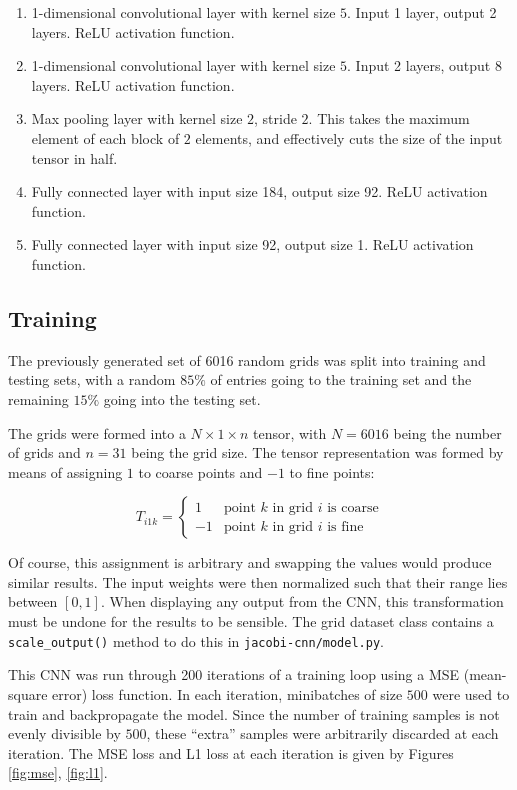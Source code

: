 \begin{enumerate}
\item 1-dimensional convolutional layer with kernel size $5$.  Input 1 layer, output 2 layers.  ReLU activation function.
\item 1-dimensional convolutional layer with kernel size $5$.  Input 2 layers, output 8 layers.  ReLU activation function.
\item Max pooling layer with kernel size $2$, stride $2$.  This takes the maximum element of each block of $2$ elements, and effectively cuts the size of the input tensor in half.
\item Fully connected layer with input size 184, output size 92.  ReLU activation function.
\item Fully connected layer with input size 92, output size 1.  ReLU activation function.
\end{enumerate}

\subsection{Training}

The previously generated set of 6016 random grids was split into training and testing sets, with a random $85\%$ of entries going to the training set and the remaining $15\%$ going into the testing set.

The grids were formed into a $N\times 1 \times n$ tensor, with $N=6016$ being the number of grids and $n=31$ being the grid size.  The tensor representation was formed by means of assigning $1$ to coarse points and $-1$ to fine points:

$$
T_{i1k} = \begin{cases}
1 & \text{point $k$ in grid $i$ is coarse}\\
-1 & \text{point $k$ in grid $i$ is fine}
\end{cases}
$$

Of course, this assignment is arbitrary and swapping the values would produce similar results.  The input weights were then normalized such that their range lies between $\left[0, 1\right]$.  When displaying any output from the CNN, this transformation must be undone for the results to be sensible.  The grid dataset class contains a \texttt{scale\_output()} method to do this in \texttt{jacobi-cnn/model.py}.

This CNN was run through 200 iterations of a training loop using a MSE (mean-square error) loss function.  In each iteration, minibatches of size $500$ were used to train and backpropagate the model.  Since the number of training samples is not evenly divisible by $500$, these ``extra'' samples were arbitrarily discarded at each iteration.  The MSE loss and L1 loss at each iteration is given by Figures \ref{fig:mse}, \ref{fig:l1}.

